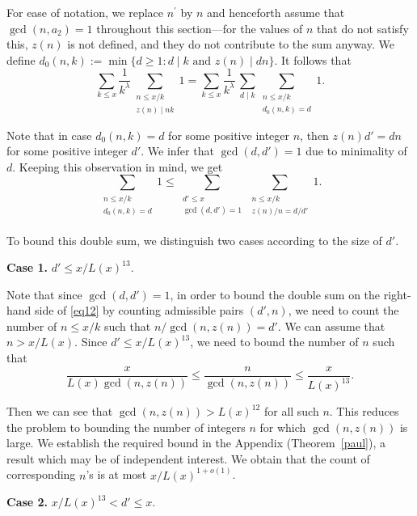\documentclass[12pt,a4paper,oneside]{amsart}
\begin{document}
\noindent For ease of notation, we replace $n^{'}$ by $n$ and henceforth assume that $\gcd(n,a_2)=1$ throughout this section---for the values of $n$ that do not satisfy this, $z(n)$ is not defined, and they do not contribute to the sum anyway. We define $d_0(n,k) := \min \{d\ge 1 : d \mid k\text{ and } z(n)\mid dn \}$.
It follows that
\begin{equation}\label{d0}\sum_{k\le x} \frac 1 {k^\lambda} \sum_{\substack{n\le x/k\\ z(n) \mid nk}} 1= \sum_{k \le x} \frac 1{k^\lambda} \,\sum_{d \mid k} \sum_{\substack{n \le x/k\\ d_0(n,k)=d}} 1.\end{equation}

\noindent Note that in case $d_0(n,k)=d$ for some positive integer $n$, then $z(n)d'=dn$ for some positive integer $d'$. We infer that $\gcd(d,d')=1$ due to minimality of $d$. Keeping this observation in mind, we get 
\begin{equation}\label{eq12} \sum_{\substack{n \le x/k\\ d_0(n,k)=d}} 1 \le  \sum_{\substack{d'\le x \\ \gcd(d,d')=1}}\sum_{\substack{n \le x/k\\ z(n)/n = d/d'\\ }}1.\end{equation}

\noindent To bound this double sum, we distinguish two cases according to the size of $d'$.
\medskip

{\bf Case 1.} $d'\le x/L(x)^{13}$.

Note that since $\gcd(d,d')=1$, in order to bound the double sum on the right-hand side of \eqref{eq12} by counting admissible pairs $(d',n)$, we need to count the number of $n\le x/k$ such that $n/\gcd(n,z(n))=d'$. We can assume that $n>x/L(x)$. Since $d'\le x/L(x)^{13}$, we need to bound the number of $n$ such that \[\frac{x}{L(x) \gcd(n,z(n))}\le \frac{n}{\gcd(n,z(n))}\le \frac{x}{L(x)^{13}}.\]

Then we can see that $\gcd(n,z(n))>L(x)^{12}$ for all such $n$. This reduces the problem to bounding the number of integers $n$ for which $\gcd(n,z(n))$ is large. We establish the required bound in the Appendix (Theorem~\ref{paul}), a result which may be of independent interest. We obtain that the count of corresponding $n$'s is at most $x/L(x)^{1+o(1)}$. 

\medskip

{\bf Case 2.} $x/L(x)^{13}<d'\le x.$
\end{document}
